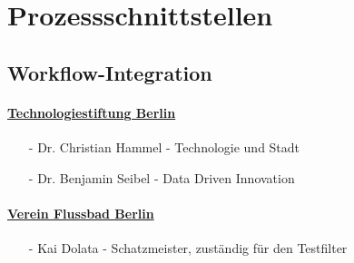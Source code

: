 \section{Prozessschnittstellen}

\subsection{Workflow-Integration}

\paragraph{\uline{Technologiestiftung Berlin}}
\begin{itemize}
\item[-] Dr. Christian Hammel - Technologie und Stadt
\item[-] Dr. Benjamin Seibel  - Data Driven Innovation
\end{itemize}

\paragraph{\uline{Verein Flussbad Berlin}}
\begin{itemize}
\item[-] Kai Dolata - Schatzmeister, zuständig für den Testfilter
\end{itemize}
